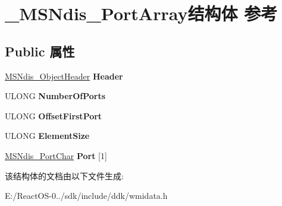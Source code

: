\hypertarget{struct___m_s_ndis___port_array}{}\section{\+\_\+\+M\+S\+Ndis\+\_\+\+Port\+Array结构体 参考}
\label{struct___m_s_ndis___port_array}
\subsection*{Public 属性}
\begin{DoxyCompactItemize}
\item 
\mbox{\label{struct___m_s_ndis___port_array_ad8eb6a85b5c2c5e7b45d6dfd1e7b42d0}} 
\hyperlink{struct___m_s_ndis___object_header}{M\+S\+Ndis\+\_\+\+Object\+Header} {\bfseries Header}
\item 
\mbox{\label{struct___m_s_ndis___port_array_a0a6aad53ca7fe822a34c20491b04a80b}} 
U\+L\+O\+NG {\bfseries Number\+Of\+Ports}
\item 
\mbox{\label{struct___m_s_ndis___port_array_adac4c7c695074aeb45ad72a1d220d1b3}} 
U\+L\+O\+NG {\bfseries Offset\+First\+Port}
\item 
\mbox{\label{struct___m_s_ndis___port_array_a2297aeec8fb88965671b27ca999a89ec}} 
U\+L\+O\+NG {\bfseries Element\+Size}
\item 
\mbox{\label{struct___m_s_ndis___port_array_a13947b860aed1b4071d583ea8b780499}} 
\hyperlink{struct___m_s_ndis___port_char}{M\+S\+Ndis\+\_\+\+Port\+Char} {\bfseries Port} \mbox{[}1\mbox{]}
\end{DoxyCompactItemize}


该结构体的文档由以下文件生成\+:\begin{DoxyCompactItemize}
\item 
E\+:/\+React\+O\+S-\/0../sdk/include/ddk/wmidata.\+h\end{DoxyCompactItemize}
